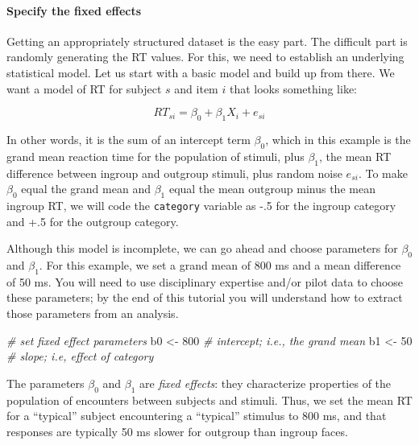 \documentclass[man,floatsintext]{apa6}
\newenvironment{Shaded}{\begin{snugshade}}{\end{snugshade}}
\newcommand{\CommentTok}[1]{\textcolor[rgb]{0.56,0.35,0.01}{\textit{#1}}}
\newcommand{\DecValTok}[1]{\textcolor[rgb]{0.00,0.00,0.81}{#1}}
\newcommand{\NormalTok}[1]{#1}
\newcommand{\StringTok}[1]{\textcolor[rgb]{0.31,0.60,0.02}{#1}}
\let\oldparagraph\paragraph
\renewcommand{\paragraph}[1]{\oldparagraph{#1}\mbox{}}
\begin{document}
\hypertarget{specify-the-fixed-effects}{%
\paragraph{Specify the fixed effects}\label{specify-the-fixed-effects}}

Getting an appropriately structured dataset is the easy part. The difficult part is randomly generating the RT values. For this, we need to establish an underlying statistical model. Let us start with a basic model and build up from there. We want a model of RT for subject \(s\) and item \(i\) that looks something like:

\begin{equation}
RT_{si} = \beta_0 + \beta_1 X_{i} + e_{si}
\end{equation}

In other words, it is the sum of an intercept term \(\beta_0\), which in this example is the grand mean reaction time for the population of stimuli, plus \(\beta_1\), the mean RT difference between ingroup and outgroup stimuli, plus random noise \(e_{si}\). To make \(\beta_0\) equal the grand mean and \(\beta_1\) equal the mean outgroup minus the mean ingroup RT, we will code the \texttt{category} variable as -.5 for the ingroup category and +.5 for the outgroup category.

Although this model is incomplete, we can go ahead and choose parameters for \(\beta_0\) and \(\beta_1\). For this example, we set a grand mean of 800 ms and a mean difference of 50 ms. You will need to use disciplinary expertise and/or pilot data to choose these parameters; by the end of this tutorial you will understand how to extract those parameters from an analysis.

\begin{Shaded}
\begin{Highlighting}[]
\CommentTok{# set fixed effect parameters}
\NormalTok{b0 <-}\StringTok{ }\DecValTok{800} \CommentTok{# intercept; i.e., the grand mean}
\NormalTok{b1 <-}\StringTok{  }\DecValTok{50} \CommentTok{# slope; i.e, effect of category}
\end{Highlighting}
\end{Shaded}

The parameters \(\beta_0\) and \(\beta_1\) are \emph{fixed effects}: they characterize properties of the population of encounters between subjects and stimuli. Thus, we set the mean RT for a \enquote{typical} subject encountering a \enquote{typical} stimulus to 800 ms, and that responses are typically 50 ms slower for outgroup than ingroup faces.
\end{document}
